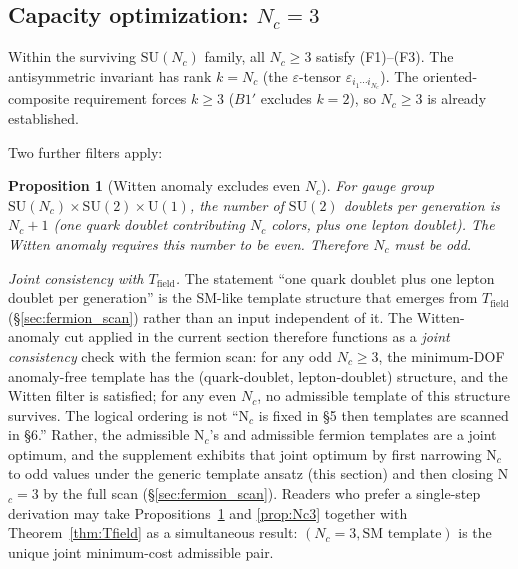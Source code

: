 \documentclass[11pt,a4paper]{article}
\newtheorem{proposition}[theorem]{Proposition}
\theoremstyle{definition}
\newcommand{\SU}{\mathrm{SU}}
\newcommand{\U}{\mathrm{U}}
\begin{document}
\subsection{Capacity optimization: $N_c = 3$}
\label{sec:Nc_optimization}

Within the surviving $\SU(N_c)$ family, all $N_c \ge 3$ satisfy
(F1)--(F3).  The antisymmetric invariant has rank $k = N_c$
(the $\varepsilon$-tensor $\varepsilon_{i_1 \cdots i_{N_c}}$).
The oriented-composite requirement forces $k \ge 3$
($B1'$ excludes $k = 2$), so $N_c \ge 3$ is already established.

Two further filters apply:

\begin{proposition}[Witten anomaly excludes even $N_c$]\label{prop:witten}
For gauge group $\SU(N_c) \times \SU(2) \times \U(1)$, the number of
$\SU(2)$ doublets per generation is $N_c + 1$ (one quark doublet
contributing $N_c$ colors, plus one lepton doublet).  The Witten anomaly
\cite{Witten1982} requires this number to be even.  Therefore $N_c$ must
be odd.
\end{proposition}

\noindent\textit{Joint consistency with $T_{\mathrm{field}}$.}\quad
The statement ``one quark doublet plus one lepton doublet per generation''
is the SM-like template structure that emerges from $T_{\mathrm{field}}$
(\S\ref{sec:fermion_scan}) rather than an input independent of it.  The
Witten-anomaly cut applied in the current section therefore functions as
a \emph{joint consistency} check with the fermion scan: for any odd
$N_c \ge 3$, the minimum-DOF anomaly-free template has the (quark-doublet,
lepton-doublet) structure, and the Witten filter is satisfied; for any
even $N_c$, no admissible template of this structure survives.  The
logical ordering is not ``N$_c$ is fixed in \S5 then templates are scanned
in \S6.''  Rather, the admissible N$_c$'s and admissible fermion templates
are a joint optimum, and the supplement exhibits that joint optimum by
first narrowing N$_c$ to odd values under the generic template ansatz
(this section) and then closing N$_c = 3$ by the full scan (\S\ref{sec:fermion_scan}).
Readers who prefer a single-step derivation may take Propositions~\ref{prop:witten}
and \ref{prop:Nc3} together with Theorem~\ref{thm:Tfield} as a simultaneous
result: $(N_c = 3, \text{SM template})$ is the unique joint
minimum-cost admissible pair.
\end{document}
